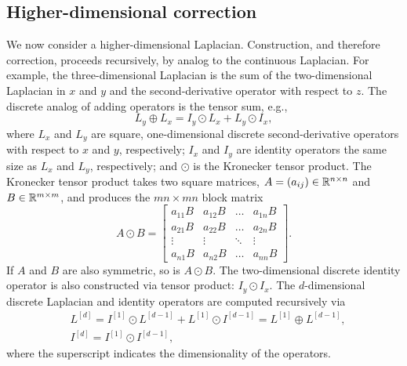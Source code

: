 \subsection{Higher-dimensional correction}

We now consider a higher-dimensional Laplacian. Construction, and therefore correction,
proceeds recursively, by analog to the continuous Laplacian. For example, the
three-dimensional Laplacian is the sum of the two-dimensional Laplacian in $x$ and $y$
and the second-derivative operator with respect to $z$. The discrete analog of adding
operators is the tensor sum, e.g.,
\begin{equation*}
    L_y \oplus L_x = I_y \odot L_x + L_y \odot I_x,
\end{equation*}
where $L_x$ and $L_y$ are square, one-dimensional discrete second-derivative operators
with respect to $x$ and $y$, respectively; $I_x$ and $I_y$ are identity operators the
same size as $L_x$ and $L_y$, respectively; and $\odot$ is the Kronecker tensor product.
The Kronecker tensor product takes two square matrices, $A = (a_{ij}) \in \mathbb{R}^{n\times n}$
and $B \in \mathbb{R}^{m\times m}$, and produces the $mn\times mn$ block matrix
\begin{equation*}
    A \odot B = \left[\begin{array}{cccc}
            a_{11} B & a_{12} B & \hdots & a_{1n} B \\
            a_{21} B & a_{22} B & \hdots & a_{2n} B \\
            \vdots   & \vdots   & \ddots & \vdots   \\
            a_{n1} B & a_{n2} B & \hdots & a_{nn} B
    \end{array}\right].
\end{equation*}
If $A$ and $B$ are also symmetric, so is $A \odot B$. The two-dimensional discrete
identity operator is also constructed via tensor product: $I_y \odot I_x$. The
$d$-dimensional discrete Laplacian and identity operators are computed recursively via
\begin{equation}\label{eq:hi-d-operators}
    \begin{aligned}
        &L^{[d]} = I^{[1]} \odot L^{[d-1]} + L^{[1]} \odot I^{[d-1]} = L^{[1]} \oplus L^{[d-1]}, \\
        &I^{[d]} = I^{[1]} \odot I^{[d-1]},
    \end{aligned}
\end{equation}
where the superscript indicates the dimensionality of the operators.

